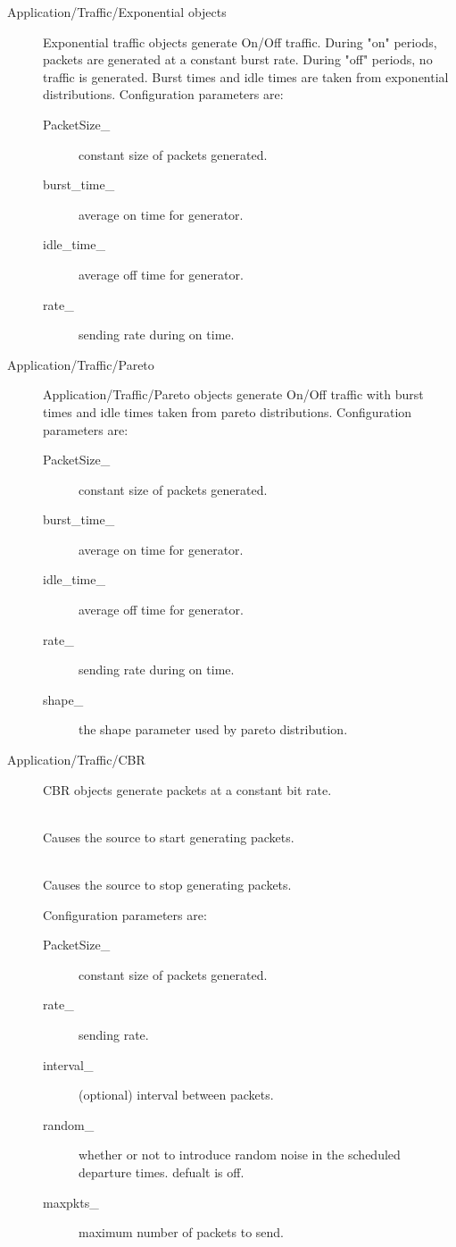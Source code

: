 \begin{description} 
\item[Application/Traffic/Exponential objects]
Exponential traffic objects generate On/Off traffic. During "on" periods,
packets are generated at a constant burst rate. During "off" periods, no
traffic is generated. Burst times and idle times are taken from
exponential distributions. Configuration parameters are:  
\begin{description} 
\item[PacketSize\_] constant size of packets generated.
\item[burst\_time\_] average on time for generator. 
\item[idle\_time\_] average off time for generator.  
\item[rate\_] sending rate during on time.  
\end{description}

\item[Application/Traffic/Pareto] 
Application/Traffic/Pareto objects generate On/Off traffic with burst
times and idle times taken from pareto distributions. Configuration
parameters are:
\begin{description}
\item[PacketSize\_] constant size of packets generated.
\item[burst\_time\_] average on time for generator.
\item[idle\_time\_] average off time for generator.
\item[rate\_] sending rate during on time.
\item[shape\_] the shape parameter used by pareto distribution.
\end{description}

\item[Application/Traffic/CBR]
CBR objects generate packets at a constant bit rate. 

\\
Causes the source to start generating packets. 

\\
Causes the source to stop generating packets. 

Configuration parameters are:
\begin{description}
\item[PacketSize\_] constant size of packets generated. 
\item[rate\_] sending rate.
\item[interval\_] (optional) interval between packets.
\item[random\_] whether or not to introduce random noise in the scheduled
departure times. defualt is off.
\item[maxpkts\_] maximum number of packets to send.
\end{description}


\end{description}
